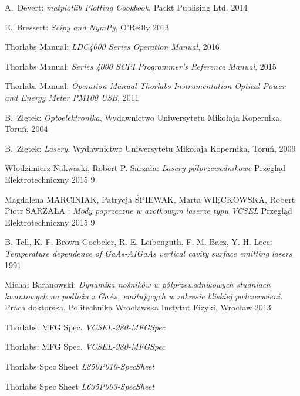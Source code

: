 \begin{thebibliography}{99}
  A.~Devert:
\emph{matplotlib Plotting Cookbook},
Packt Publising Ltd. 2014

 E.~Bressert:
\emph{Scipy and NymPy},
O'Reilly 2013

 Thorlabs Manual:
\emph{LDC4000 Series Operation Manual},
2016

 Thorlabs Manual:
\emph{Series 4000 SCPI Programmer's Reference Manual},
2015

 Thorlabs Manual:
\emph{Operation Manual
Thorlabs Instrumentation Optical Power and Energy Meter PM100 USB},
2011

  B.~Ziętek:
\emph{Optoelektronika},
Wydawnictwo Uniwersytetu Mikołaja Kopernika, Toruń, 2004

  B.~Ziętek:
\emph{Lasery},
Wydawnictwo Uniwersytetu Mikołaja Kopernika, Toruń, 2009

 Włodzimierz Nakwaski, Robert P. Sarzała:
\emph{Lasery półprzewodnikowe}
 Przegląd Elektrotechniczny 2015 9

 Magdalena MARCINIAK, Patrycja
ŚPIEWAK, Marta WIĘCKOWSKA, Robert Piotr SARZAŁA :
\emph{Mody poprzeczne w azotkowym laserze typu VCSEL}
 Przegląd Elektrotechniczny 2015 9

 B. Tell, K. F. Brown-Goebeler, R. E. Leibenguth, F. M.  Baez, Y. H. Leec:
\emph{Temperature dependence of GaAs-AIGaAs vertical cavity surface emitting lasers }
1991

 Michał Baranowski:
\emph{Dynamika nośników w półprzewodnikowych
studniach kwantowych na podłożu z GaAs, emitujących w zakresie bliskiej podczerwieni.}
Praca doktorska, Politechnika Wrocławska
Instytut Fizyki, Wrocław 2013

 Thorlabs:
MFG Spec,
\emph{VCSEL-980-MFGSpec}

 Thorlabs:
MFG Spec,
\emph{VCSEL-980-MFGSpec}

 Thorlabs
Spec Sheet
\emph{L850P010-SpecSheet}

 Thorlabs
Spec Sheet
\emph{L635P003-SpecSheet}
\end{thebibliography}
